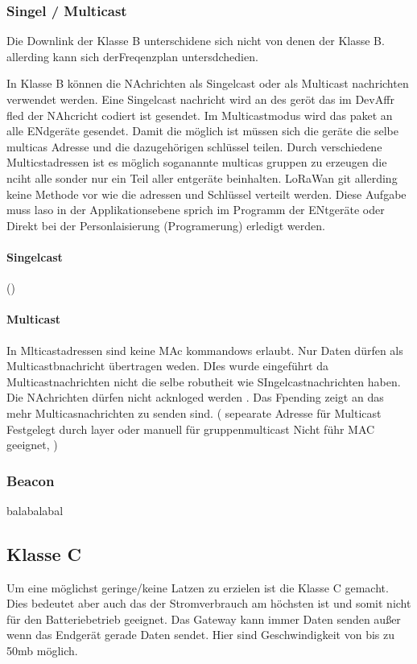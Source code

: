 \documentclass[a4paper,12pt]{article}
\begin{document}
            \subsubsection{Singel / Multicast}
                Die Downlink der Klasse B unterschidene sich nicht von denen der Klasse B. allerding kann sich derFreqenzplan untersdchedien.
                
                In Klasse B können die NAchrichten als Singelcast oder als Multicast nachrichten verwendet werden. Eine Singelcast nachricht wird an des geröt das im DevAffr fled der NAhcricht codiert ist gesendet. Im Multicastmodus wird das paket an alle ENdgeräte gesendet.
                Damit die möglich ist müssen sich die geräte die selbe multicas Adresse und die dazugehörigen schlüssel teilen. Durch verschiedene Multicstadressen ist es möglich soganannte
                multicas gruppen zu erzeugen die nciht alle sonder nur ein Teil aller entgeräte beinhalten. LoRaWan git allerding keine Methode vor wie die adressen und Schlüssel verteilt werden. Diese Aufgabe muss laso in der Applikationsebene sprich im Programm der ENtgeräte oder Direkt bei der Personlaisierung (Programerung) erledigt werden.
                

                \paragraph{Singelcast}
                    \cite{LoRaSpec}()
                \paragraph{Multicast}
                    In Mlticastadressen sind keine MAc kommandows erlaubt. Nur Daten dürfen als Multicastbnachricht übertragen weden. DIes wurde eingeführt da Multicastnachrichten nicht die selbe robutheit wie SIngelcastnachrichten haben.
                    Die NAchrichten dürfen nicht acknloged werden . Das Fpending zeigt an das mehr Multicasnachrichten zu senden sind.
                    \cite{LoRaSpec}(
                        sepearate Adresse für Multicast
                        Festgelegt durch layer oder manuell für gruppenmulticast
                        Nicht führ MAC geeignet, 
                    )
            \subsubsection{Beacon}
                balabalabal
        \subsection{Klasse C}
            Um eine möglichst geringe/keine Latzen zu erzielen ist die Klasse C gemacht. Dies bedeutet aber auch das der Stromverbrauch am höchsten ist und somit nicht für den Batteriebetrieb geeignet.
            Das Gateway kann immer Daten senden außer wenn das Endgerät gerade Daten sendet. Hier sind Geschwindigkeit von bis zu 50mb möglich.
\end{document}
